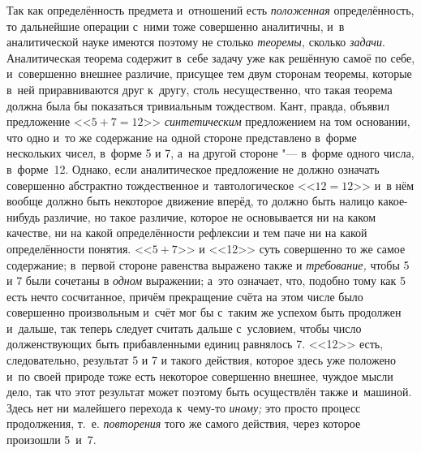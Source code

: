 Так как определённость предмета и~отношений есть {\em положенная}
определённость, то дальнейшие операции с~ними тоже совершенно
аналитичны, и~в аналитической науке имеются поэтому не столько
{\em теоремы,} сколько {\em задачи}.
Аналитическая теорема содержит в~себе задачу уже как решённую
самоё по себе, и~совершенно внешнее различие, присущее тем двум сторонам
теоремы, которые в~ней приравниваются друг к~другу, столь несущественно,
что такая теорема должна была бы показаться тривиальным тождеством. Кант,
правда, объявил предложение <<$5+7=12$>> {\em синтетическим}
предложением на том основании, что одно и~то же содержание на
одной стороне представлено в~форме нескольких чисел, в~форме 5 и 7, а~на
другой стороне "--- в~форме одного числа, в~форме~12.
Однако, если аналитическое предложение не
должно означать совершенно абстрактно тождественное и~тавтологическое
<<$12=12$>> и~в нём вообще должно быть некоторое движение вперёд, то должно
быть налицо какое-нибудь различие, но такое различие, которое не
основывается ни на каком качестве, ни на какой определённости рефлексии и
тем паче ни на какой определённости понятия. <<$5+7$>> и <<12>> суть совершенно
то же самое содержание; в~первой стороне равенства выражено также и
{\em требование,} чтобы 5 и 7 были сочетаны в {\em одном}
выражении; а~это означает, что, подобно тому как 5 есть нечто
сосчитанное, причём прекращение счёта на этом числе было совершенно
произвольным и~счёт мог бы с~таким же успехом быть продолжен и~дальше, так
теперь следует считать дальше с~условием, чтобы число долженствующих быть
прибавленными единиц равнялось 7. <<12>> есть, следовательно, результат 5 и 7
и такого действия, которое здесь уже положено и~по своей природе тоже есть
некоторое совершенно внешнее, чуждое мысли дело, так что этот результат
может поэтому быть осуществлён также и~машиной. Здесь нет ни малейшего
перехода к~чему-то {\em иному;} это просто процесс продолжения, т.~е.
{\em повторения} того же самого действия, через которое произошли 5~и~7.

